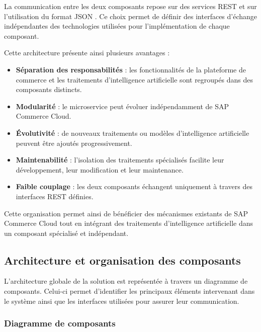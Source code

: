 La communication entre les deux composants repose sur des services REST  et sur l'utilisation du format JSON . Ce choix permet de définir des interfaces d'échange indépendantes des technologies utilisées pour l'implémentation de chaque composant.

Cette architecture présente ainsi plusieurs avantages :

\begin{itemize}
    \item \textbf{Séparation des responsabilités} : les fonctionnalités de la plateforme de commerce et les traitements d'intelligence artificielle sont regroupés dans des composants distincts.

    \item \textbf{Modularité} : le microservice peut évoluer indépendamment de SAP Commerce Cloud.

    \item \textbf{Évolutivité} : de nouveaux traitements ou modèles d'intelligence artificielle peuvent être ajoutés progressivement.

    \item \textbf{Maintenabilité} : l'isolation des traitements spécialisés facilite leur développement, leur modification et leur maintenance.

    \item \textbf{Faible couplage} : les deux composants échangent uniquement à travers des interfaces REST définies.
\end{itemize}

Cette organisation permet ainsi de bénéficier des mécanismes existants de SAP Commerce Cloud tout en intégrant des traitements d'intelligence artificielle dans un composant spécialisé et indépendant.

\subsection{Architecture et organisation des composants}

L'architecture globale de la solution est représentée à travers un diagramme de composants. Celui-ci permet d'identifier les principaux éléments intervenant dans le système ainsi que les interfaces utilisées pour assurer leur communication.

\subsubsection{Diagramme de composants}

